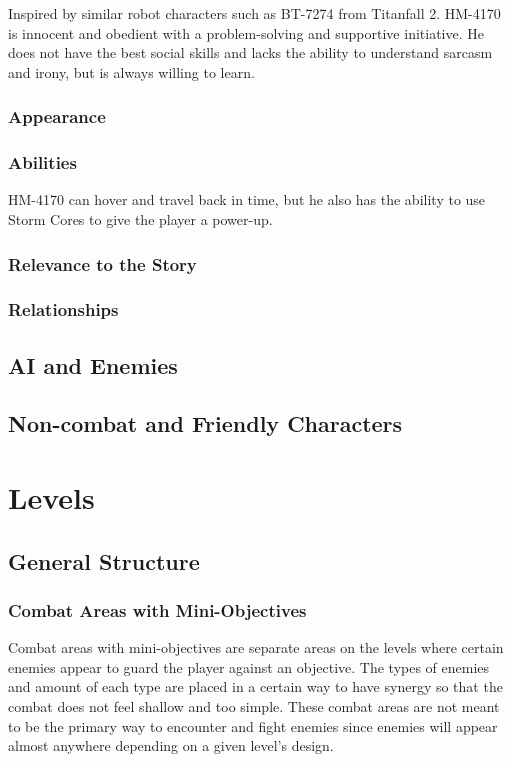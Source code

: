 \documentclass[12pt]{article}
\begin{document}
Inspired by similar robot characters such as BT-7274 from Titanfall 2. HM-4170 is innocent and obedient with a problem-solving and supportive initiative. He does not have the best social skills and lacks the ability to understand sarcasm and irony, but is always willing to learn.

\subsubsection{Appearance}

\subsubsection{Abilities}

HM-4170 can hover and travel back in time, but he also has the ability to use Storm Cores to give the player a power-up. 

\subsubsection{Relevance to the Story}

\subsubsection{Relationships}

\subsection{AI and Enemies}

\subsection{Non-combat and Friendly Characters}

\section{Levels}

\subsection{General Structure}

\subsubsection{Combat Areas with Mini-Objectives}

Combat areas with mini-objectives are separate areas on the levels where certain enemies appear to guard the player against an objective. The types of enemies and amount of each type are placed in a certain way to have synergy so that the combat does not feel shallow and too simple. These combat areas are not meant to be the primary way to encounter and fight enemies since enemies will appear almost anywhere depending on a given level's design. 
\end{document}
